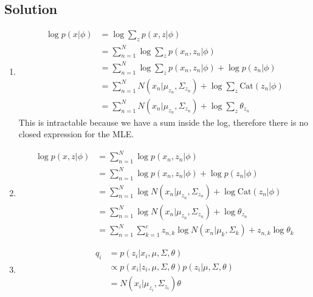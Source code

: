 \documentclass[submit]{harvardml}
\begin{document}
\subsection*{Solution}
\begin{enumerate}
    \item
        \begin{align*}
            \log p(x|\phi) &= \log \sum_{z}p(x,z|\phi) \\
                           &= \sum_{n=1}^{N}\log\sum_{z}p(x_n,z_n|\phi) \\
                           &= \sum_{n=1}^{N}\log\sum_{z}p(x_n,z_n|\phi) + \log
                              p(z_n|\phi) \\
                           &= \sum_{n=1}^{N}N(x_n|\mu_{z_n},\Sigma_{z_n}) +
                              \log \sum_{z} \text{Cat}(z_n|\phi) \\
                           &= \sum_{n=1}^{N}N(x_n|\mu_{z_n},\Sigma_{z_n}) +
                              \log \sum_{z} \theta_{z_n}
        \end{align*}
        This is intractable because we have a sum inside the log, therefore
        there is no closed expression for the MLE.
    \item
        \begin{align*}
            \log p(x,z|\phi) &= \sum_{n=1}^{N}\log p(x_n,z_n|\phi) \\
                             &= \sum_{n=1}^{N}\log p(x_n,z_n|\phi) + \log
                                p(z_n|\phi) \\
                             &= \sum_{n=1}^{N}\log N(x_n|\mu_{z_n},
                                \Sigma_{z_n}) + \log \text{Cat}(z_n|\phi) \\
                             &= \sum_{n=1}^{N}\log N(x_n|\mu_{z_n},
                                \Sigma_{z_n}) + \log \theta_{z_n} \\
                             &= \sum_{n=1}^{N}\sum_{k=1}^{c}z_{n,k} \log
                                N(x_n|\mu_k,\Sigma_k) + z_{n,k} \log \theta_k
        \end{align*}
    \item
        \begin{align*}
            q_i &= p(z_i|x_i,\mu,\Sigma,\theta) \\
                &\propto p(x_i|z_i,\mu,\Sigma,\theta)
                    p(z_i|\mu,\Sigma,\theta) \\
                &= N(x_i|\mu_{z_i},\Sigma_{z_i})\theta
        \end{align*}

\end{enumerate}
\end{document}
